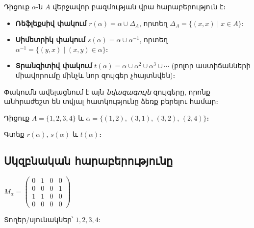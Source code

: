 \documentclass[12pt, a4paper]{article}
\begin{document}
\begin{theorybox}
Դիցուք $\alpha$-ն $A$ վերջավոր բազմության վրա հարաբերություն է։
\begin{itemize}[nosep]
  \item \textbf{Ռեֆլեքսիվ փակում} $r(\alpha) = \alpha \cup \Delta_A$, որտեղ $\Delta_A = \{(x,x) \mid x \in A\}$։
  \item \textbf{Սիմետրիկ փակում} $s(\alpha) = \alpha \cup \alpha^{-1}$, որտեղ $\alpha^{-1} = \{(y,x) \mid (x,y) \in \alpha\}$։
  \item \textbf{Տրանզիտիվ փակում} $t(\alpha) = \alpha \cup \alpha^2 \cup \alpha^3 \cup \cdots$\; (բոլոր աստիճանների միավորումը մինչև նոր զույգեր չհայտնվեն)։
\end{itemize}
Փակումն ավելացնում է այն \emph{նվազագույն} զույգերը, որոնք անհրաժեշտ են տվյալ հատկությունը ձեռք բերելու համար։
\end{theorybox}

\begin{problembox}
Դիցուք $A = \{1, 2, 3, 4\}$ և $\alpha = \{(1,2),\,(3,1),\,(3,2),\,(2,4)\}$։

Գտեք $r(\alpha)$, $s(\alpha)$ և $t(\alpha)$։
\end{problembox}

\subsection*{Սկզբնական հարաբերությունը}

\begin{center}
\begin{minipage}{0.45\textwidth}\centering
{}
\end{minipage}%
\begin{minipage}{0.45\textwidth}\centering
$M_\alpha = \begin{pmatrix}
  0 & 1 & 0 & 0 \\
  0 & 0 & 0 & 1 \\
  1 & 1 & 0 & 0 \\
  0 & 0 & 0 & 0
\end{pmatrix}$

{\small Տողեր/սյունակներ՝ $1,2,3,4$:}
\end{minipage}
\end{center}
\end{document}
